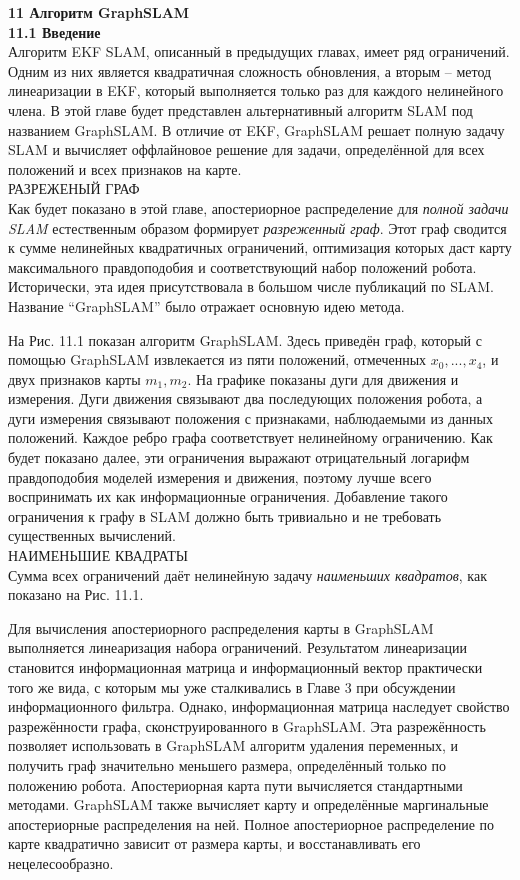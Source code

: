 \documentclass[10pt,a4paper]{article}
\begin{document}
 

\textbf{11 Алгоритм GraphSLAM}\\

\textbf{11.1	Введение}\\

Алгоритм EKF SLAM, описанный в предыдущих главах, имеет ряд ограничений. Одним из них является квадратичная сложность обновления, а вторым – метод линеаризации в EKF, который выполняется только раз для каждого нелинейного члена. В этой главе будет представлен альтернативный алгоритм SLAM под названием GraphSLAM. В отличие от EKF, GraphSLAM решает полную задачу SLAM и вычисляет оффлайновое решение для  задачи, определённой для всех положений и всех признаков на карте.\\ 
РАЗРЕЖЕНЫЙ ГРАФ\\
Как будет показано в этой главе, апостериорное распределение для \textit{полной задачи SLAM} естественным образом формирует \textit{разреженный граф}. Этот граф сводится к сумме нелинейных квадратичных ограничений, оптимизация которых даст карту максимального правдоподобия и соответствующий набор положений робота. Исторически, эта идея присутствовала в большом числе публикаций по SLAM. Название “GraphSLAM” было отражает основную идею метода.

На Рис. 11.1 показан алгоритм GraphSLAM. Здесь приведён граф, который с помощью GraphSLAM извлекается из пяти положений, отмеченных $x_0,..., x_4$, и двух признаков карты $m_1, m_2$. На графике показаны дуги для движения и измерения. Дуги движения связывают два последующих положения робота, а дуги измерения связывают положения с признаками, наблюдаемыми из данных положений. Каждое ребро графа соответствует нелинейному ограничению. Как будет показано далее, эти ограничения выражают отрицательный логарифм правдоподобия моделей измерения и движения, поэтому лучше всего воспринимать их как информационные ограничения. Добавление такого ограничения к графу в SLAM должно быть тривиально и не требовать существенных вычислений. \\
НАИМЕНЬШИЕ КВАДРАТЫ\\
Сумма всех ограничений даёт нелинейную задачу \textit{наименьших квадратов}, как показано на Рис. 11.1.

Для вычисления апостериорного распределения карты в GraphSLAM выполняется линеаризация набора ограничений. Результатом линеаризации становится информационная матрица и информационный вектор практически того же вида, с которым мы уже сталкивались в Главе 3 при обсуждении информационного фильтра. Однако, информационная матрица наследует свойство разрежённости графа, сконструированного в GraphSLAM. Эта разрежённость позволяет использовать в GraphSLAM алгоритм удаления переменных, и получить граф значительно меньшего размера, определённый только по положению робота. Апостериорная карта пути вычисляется стандартными методами. GraphSLAM также вычисляет карту и определённые маргинальные апостериорные распределения на ней. Полное апостериорное распределение по карте квадратично зависит от размера карты, и восстанавливать его нецелесообразно.
\end{document}
